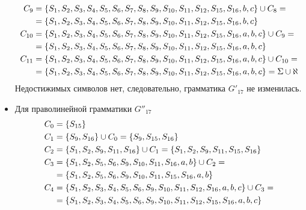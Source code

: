 \begin{itemize}
\begin{align*}
		      C_{9}  & = \left\{S_1, S_2, S_3, S_4, S_5, S_6, S_7, S_8, S_9, S_{10}, S_{11}, S_{12}, S_{15}, S_{16}, b, c\right\} \cup C_{8} =            \\
		             & = \left\{S_1, S_2, S_3, S_4, S_5, S_6, S_7, S_8, S_9, S_{10}, S_{11}, S_{12}, S_{15}, S_{16}, b, c\right\}                         \\
		      C_{10} & = \left\{S_1, S_2, S_3, S_4, S_5, S_6, S_7, S_8, S_9, S_{10}, S_{11}, S_{12}, S_{15}, S_{16}, a, b, c\right\} \cup C_{9} =         \\
		             & = \left\{S_1, S_2, S_3, S_4, S_5, S_6, S_7, S_8, S_9, S_{10}, S_{11}, S_{12}, S_{15}, S_{16}, a, b, c\right\}                      \\
		      C_{11} & = \left\{S_1, S_2, S_3, S_4, S_5, S_6, S_7, S_8, S_9, S_{10}, S_{11}, S_{12}, S_{15}, S_{16}, a, b, c\right\} \cup C_{10} =        \\
		             & = \left\{S_1, S_2, S_3, S_4, S_5, S_6, S_7, S_8, S_9, S_{10}, S_{11}, S_{12}, S_{15}, S_{16}, a, b, c\right\} = \Sigma \cup \aleph
	      \end{align*}
	      Недостижимых символов нет, следовательно, грамматика \(G'_{17}\) не изменилась.
	\item Для праволинейной грамматики \(G''_{17}\)
	      \begin{align*}
		      C_{0} & = \cbr{S_{15}}                                                                                                            \\
		      C_{1} & = \cbr{S_9, S_{16}} \cup C_{0} = \cbr{S_9, S_{15}, S_{16}}                                                                \\
		      C_{2} & = \cbr{S_1, S_2, S_9, S_{11}, S_{16}} \cup C_{1} = \cbr{S_1, S_2, S_9, S_{11}, S_{15}, S_{16}}                            \\
		      C_{3} & = \cbr{S_1, S_2, S_5, S_6, S_9, S_{10}, S_{11}, S_{16}, a, b} \cup C_{2} =                                                \\
		            & = \cbr{S_1, S_2, S_5, S_6, S_9, S_{10}, S_{11}, S_{15}, S_{16}, a, b}                                                     \\
		      C_{4} & = \cbr{S_1, S_2, S_3, S_4, S_5, S_6, S_9, S_{10}, S_{11}, S_{12}, S_{16}, a, b, c} \cup C_{3} =                           \\
		            & = \cbr{S_1, S_2, S_3, S_4, S_5, S_6, S_9, S_{10}, S_{11}, S_{12}, S_{15}, S_{16}, a, b, c}                                \\

\end{align*}
\end{itemize}
